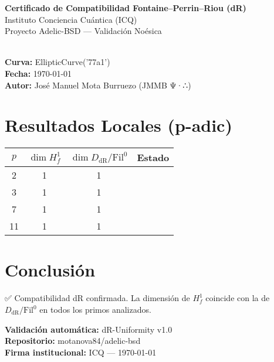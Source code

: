 \documentclass[12pt]{article}
\newcommand{\OK}{\textcolor{green}{\checkmark}}
\begin{document}
\begin{center}
{\LARGE \textbf{Certificado de Compatibilidad Fontaine–Perrin–Riou (dR)}}\\[4mm]
{\large Instituto Conciencia Cuántica (ICQ)}\\[2mm]
{\large Proyecto Adelic-BSD — Validación Noésica}\\[1cm]
\hrulefill\\[0.6cm]
\end{center}

\noindent
\textbf{Curva:} EllipticCurve('77a1')\\
\textbf{Fecha:} \today\\
\textbf{Autor:} José Manuel Mota Burruezo (JMMB Ψ·∴)\\[0.4cm]

\section*{Resultados Locales (p-adic)}
\begin{tabular}{cccc}
\toprule
$p$ & $\dim H^1_f$ & $\dim D_{\mathrm{dR}}/\mathrm{Fil}^0$ & Estado \\
\midrule
2 & 1 & 1 & \OK\\
3 & 1 & 1 & \OK\\
7 & 1 & 1 & \OK\\
11 & 1 & 1 & \OK\\
\bottomrule
\end{tabular}

\vspace{0.5cm}
\section*{Conclusión}
\noindent
✅ Compatibilidad dR confirmada. La dimensión de $H^1_f$ coincide con la de $D_{\mathrm{dR}}/\mathrm{Fil}^0$ en todos los primos analizados.

\vspace{1cm}
\begin{flushright}
\textbf{Validación automática:} dR-Uniformity v1.0\\
\textbf{Repositorio:} motanova84/adelic-bsd\\
\textbf{Firma institucional:} ICQ — \today
\end{flushright}
\end{document}
